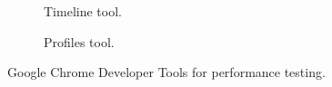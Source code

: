 
\begin{figure}[H]
	\newcommand{\figurewidth}{0.5\textwidth}
	\begin{subfigure}[b]{\figurewidth}
        \centering
        \caption{Timeline tool.}
        \label{fig:timeline_tool}
    \end{subfigure}
    \begin{subfigure}[b]{\figurewidth}
        \centering
        \caption{Profiles tool.}
        \label{fig:profiles_tool}
    \end{subfigure}
	\caption{Google Chrome Developer Tools for performance testing.}
	\label{fig:performance_tools}
\end{figure}
